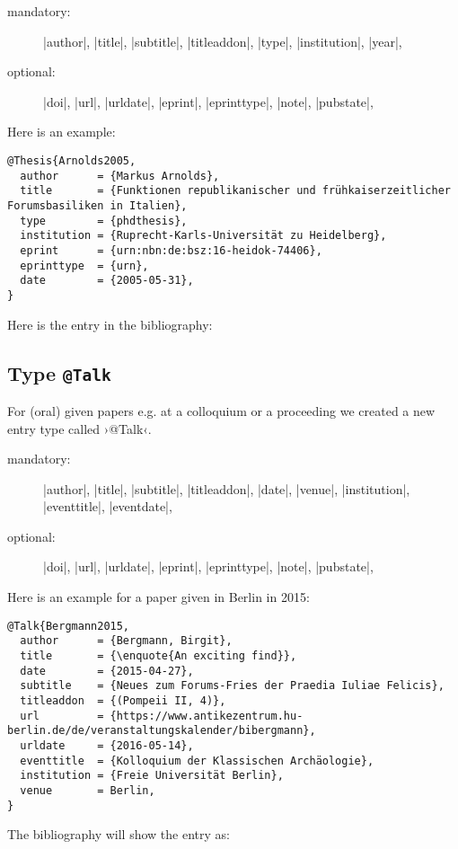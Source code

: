 \documentclass[a4paper,
10pt,
greek,
french,
spanish,
italian,
ngerman,
english
]{ltxdoc}
\begin{document}
\begin{description}
\item[mandatory:] 
|author|,
|title|, |subtitle|, |titleaddon|,
|type|, |institution|,
|year|,
\item[optional:]
|doi|, |url|, |urldate|, |eprint|, |eprinttype|, |note|, |pubstate|, 
 \end{description}
 

Here is an example:
\begin{lstlisting}[style=bibentry,label=Arnolds2005,caption={{@}Thesis\{Arnolds2005,…\} }]
@Thesis{Arnolds2005,
  author      = {Markus Arnolds},
  title       = {Funktionen republikanischer und frühkaiserzeitlicher Forumsbasiliken in Italien},
  type        = {phdthesis},
  institution = {Ruprecht-Karls-Universität zu Heidelberg},
  eprint      = {urn:nbn:de:bsz:16-heidok-74406},
  eprinttype  = {urn},
  date        = {2005-05-31},
}
\end{lstlisting}

Here is the entry in the bibliography:


 

 \subsection{Type \texttt{@Talk}}\label{talk}
For (oral) given papers e.g. at a colloquium or a proceeding we created a new entry type called ›@Talk‹.

\begin{description}
\item[mandatory:] 
|author|,
|title|, |subtitle|, |titleaddon|,
|date|,
|venue|,
|institution|,
|eventtitle|,
|eventdate|,
\item[optional:]
|doi|, |url|, |urldate|, |eprint|, |eprinttype|, |note|, |pubstate|, 
 \end{description}
 
Here is an example for a  paper  given in Berlin in 2015:
\begin{lstlisting}[style=bibentry,label=Bergmann2015,caption={{@}Talk\{Bergmann2015,…\} }]
@Talk{Bergmann2015,
  author      = {Bergmann, Birgit},
  title       = {\enquote{An exciting find}},
  date        = {2015-04-27},
  subtitle    = {Neues zum Forums-Fries der Praedia Iuliae Felicis},
  titleaddon  = {(Pompeii II, 4)},
  url         = {https://www.antikezentrum.hu-berlin.de/de/veranstaltungskalender/bibergmann},
  urldate     = {2016-05-14},
  eventtitle  = {Kolloquium der Klassischen Archäologie},
  institution = {Freie Universität Berlin},
  venue       = Berlin,
}
\end{lstlisting}
The bibliography will show the entry as:
\end{document}
